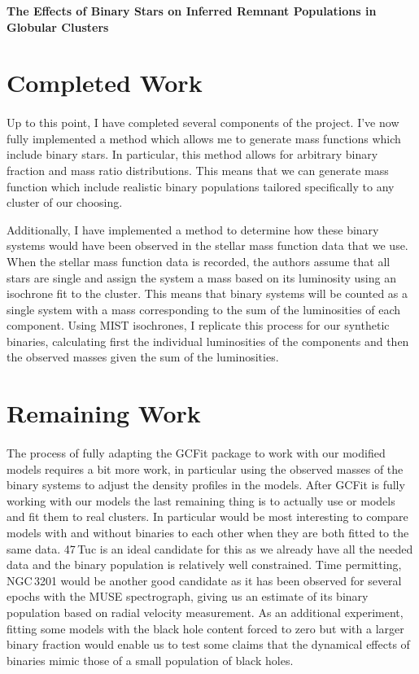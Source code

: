\documentclass[12pt,letterpaper]{article}
\begin{document}
\begin{center}
	\Large{\textbf{The Effects of Binary Stars on Inferred Remnant Populations in Globular
			Clusters}}
\end{center}



\section{Completed Work}
\paragraph{}
Up to this point, I have completed several components of the project. I've now fully implemented a
method which allows me to generate mass functions which include binary stars. In particular, this
method allows for arbitrary binary fraction and mass ratio distributions. This means that we can
generate mass function which include realistic binary populations tailored specifically to any
cluster of our choosing.

Additionally, I have implemented a method to determine how these binary systems would have been
observed in the stellar mass function data that we use. When the stellar mass function data is
recorded, the authors assume that all stars are single and assign the system a mass based on its
luminosity using an isochrone fit to the cluster. This means that binary systems will be counted as
a single system with a mass corresponding to the sum of the luminosities of each component. Using
MIST isochrones, I replicate this process for our synthetic binaries, calculating first the
individual luminosities of the components and then the observed masses given the sum of the
luminosities.


\section{Remaining Work}
\paragraph{}

The process of fully adapting the GCFit package to work with our modified models requires a bit more
work, in particular using the observed masses of the binary systems to adjust the density profiles
in the models. After GCFit is fully working with our models the last remaining thing is to actually
use or models and fit them to real clusters. In particular would be most interesting to compare
models with and without binaries to each other when they are both fitted to the same data. 47\,Tuc
is an ideal candidate for this as we already have all the needed data and the binary population is
relatively well constrained. Time permitting, NGC\,3201 would be another good candidate as it has
been observed for several epochs with the MUSE spectrograph, giving us an estimate of its binary
population based on radial velocity measurement. As an additional experiment, fitting some models
with the black hole content forced to zero but with a larger binary fraction would enable us to test
some claims that the dynamical effects of binaries mimic those of a small population of black holes.
\end{document}
